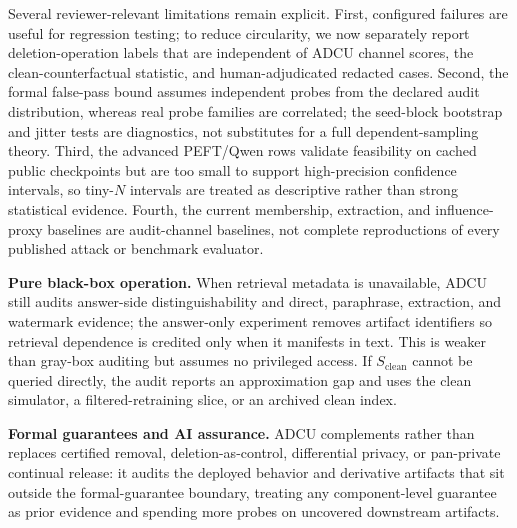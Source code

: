 \documentclass[10pt,journal,compsoc]{IEEEtran}
\newcommand{\method}{ADCU}
\begin{document}
Several reviewer-relevant limitations remain explicit. First, configured failures are useful for regression testing; to reduce circularity, we now separately report deletion-operation labels that are independent of ADCU channel scores, the clean-counterfactual statistic, and human-adjudicated redacted cases. Second, the formal false-pass bound assumes independent probes from the declared audit distribution, whereas real probe families are correlated; the seed-block bootstrap and jitter tests are diagnostics, not substitutes for a full dependent-sampling theory. Third, the advanced PEFT/Qwen rows validate feasibility on cached public checkpoints but are too small to support high-precision confidence intervals, so tiny-$N$ intervals are treated as descriptive rather than strong statistical evidence. Fourth, the current membership, extraction, and influence-proxy baselines are audit-channel baselines, not complete reproductions of every published attack or benchmark evaluator.

\textbf{Pure black-box operation.}
When retrieval metadata is unavailable, \method{} still audits answer-side distinguishability and direct, paraphrase, extraction, and watermark evidence; the answer-only experiment removes artifact identifiers so retrieval dependence is credited only when it manifests in text. This is weaker than gray-box auditing but assumes no privileged access. If $S_{\mathrm{clean}}$ cannot be queried directly, the audit reports an approximation gap and uses the clean simulator, a filtered-retraining slice, or an archived clean index.

\textbf{Formal guarantees and AI assurance.}
\method{} complements rather than replaces certified removal, deletion-as-control, differential privacy, or pan-private continual release: it audits the deployed behavior and derivative artifacts that sit outside the formal-guarantee boundary, treating any component-level guarantee as prior evidence and spending more probes on uncovered downstream artifacts.


\end{document}
